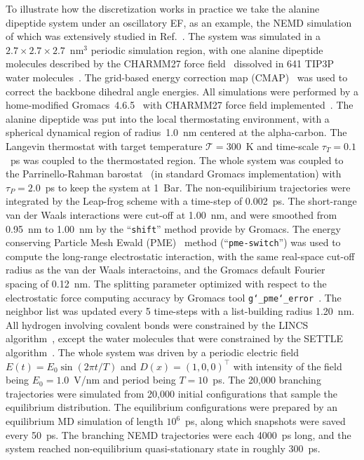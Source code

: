 \documentclass[aps, pre, preprint,unsortedaddress,a4paper,onecolumn]{revtex4}
\newcommand{\redc}[1]{{\color{red} #1}}
\begin{document}
To illustrate how the discretization works in practice we take the alanine dipeptide system under an oscillatory EF,
as an example, the NEMD simulation of which was
extensively studied in Ref.~\cite{wang2014exploring}.
The system was simulated in a $2.7\times 2.7\times 2.7$~$\textrm{nm}^3$ periodic simulation
region, with one alanine dipeptide molecules described by the CHARMM27 force field~\cite{foloppe2000all} dissolved in 641 TIP3P water molecules~\cite{jorgensen1983comparison}.
The grid-based energy correction map (CMAP)~\cite{mackerell2004extending} was used
to correct the backbone dihedral angle energies.
All simulations were performed by a home-modified
Gromacs~4.6.5~\cite{pronk2013gromacs} with CHARMM27 force field implemented~\cite{bjelkmar2010implementation}.
The alanine dipeptide was put into the local thermostating
environment, with a spherical dynamical region of radius~1.0~nm
centered at the alpha-carbon.
The Langevin thermostat with target temperature $\mathcal T = 300$~K
and time-scale $\tau_T = 0.1$~ps was
coupled to the thermostated region.
The whole system was coupled to the Parrinello-Rahman barostat~\cite{parrinello1981polymorphic} (in standard Gromacs implementation) with $\tau_P = 2.0$~ps to
keep the system at 1~Bar. The non-equilibirium trajectories
were integrated by the Leap-frog scheme with a time-step of 0.002~ps.
The short-range van der Waals interactions were cut-off at 1.00~nm, and were smoothed from
0.95~nm to 1.00~nm by the ``\texttt{shift}'' method provide by Gromacs.
The energy conserving 
Particle Mesh Ewald (PME)~\cite{darden1993pme, essmann1995spm} method (``\texttt{pme-switch}'') was
used to compute the long-range electrostatic interaction,
with the same real-space cut-off radius as the van der Waals interactoins,
and the Gromacs default Fourier spacing of 0.12~nm.
The splitting
parameter optimized with respect to the electrostatic force computing
accuracy by Gromacs tool \texttt{g\char`_pme\char`_error}~\cite{wang2010optimizing}.
The neighbor list was updated every 5 time-steps with a list-building radius 1.20~nm.
All hydrogen involving covalent bonds were constrained by the LINCS algorithm~\cite{hess1997lincs}, except the water molecules that were constrained by the SETTLE algorithm~\cite{miyamoto2004settle}.
The whole system was driven by a periodic electric field
$E(t) = E_0\sin(2\pi t/T)$ and $D(x) = (1,0,0)^{\top}$
with intensity of the field being $E_0 = 1.0$~V/nm and period being
$T = 10$~ps.
The 20,000 branching trajectories were simulated from 20,000
initial configurations that sample the equilibrium distribution.
The equilibrium configurations were prepared by an equilibrium MD simulation
of length $10^6$~ps, along which snapshots were saved every 50~ps.
The branching NEMD
trajectories were each 4000~ps long, and the system reached
non-equilibrium quasi-stationary state in roughly 300~ps.
\end{document}
